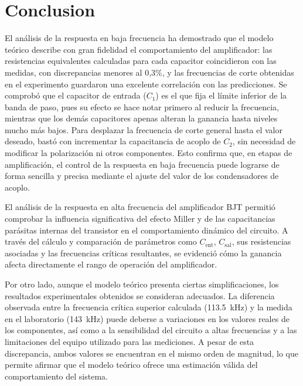 \documentclass[journal]{IEEEtran}
\begin{document}
\section{Conclusion}
\par El análisis de la respuesta en baja frecuencia ha demostrado que el modelo teórico describe con gran fidelidad el comportamiento del amplificador: las resistencias equivalentes calculadas para cada capacitor coincidieron con las medidas, con discrepancias menores al 0,3\%, y las frecuencias de corte obtenidas en el experimento guardaron una excelente correlación con las predicciones. Se comprobó que el capacitor de entrada (\(C_1\)) es el que fija el límite inferior de la banda de paso, pues su efecto se hace notar primero al reducir la frecuencia, mientras que los demás capacitores apenas alteran la ganancia hasta niveles mucho más bajos. Para desplazar la frecuencia de corte general hasta el valor deseado, bastó con incrementar la capacitancia de acoplo de \(C_2\), sin necesidad de modificar la polarización ni otros componentes. Esto confirma que, en etapas de amplificación, el control de la respuesta en baja frecuencia puede lograrse de forma sencilla y precisa mediante el ajuste del valor de los condensadores de acoplo.
\par El análisis de la respuesta en alta frecuencia del amplificador BJT permitió comprobar la influencia significativa del efecto Miller y de las capacitancias parásitas internas del transistor en el comportamiento dinámico del circuito. A través del cálculo y comparación de parámetros como $C_{\text{ent}}$, $C_{\text{sal}}$, sus resistencias asociadas y las frecuencias críticas resultantes, se evidenció cómo la ganancia afecta directamente el rango de operación del amplificador.
\par Por otro lado, aunque el modelo teórico presenta ciertas simplificaciones, los resultados experimentales obtenidos se consideran adecuados. La diferencia observada entre la frecuencia crítica superior calculada (113.5~kHz) y la medida en el laboratorio (143~kHz) puede deberse a variaciones en los valores reales de los componentes, así como a la sensibilidad del circuito a altas frecuencias y a las limitaciones del equipo utilizado para las mediciones. A pesar de esta discrepancia, ambos valores se encuentran en el mismo orden de magnitud, lo que permite afirmar que el modelo teórico ofrece una estimación válida del comportamiento del sistema.


\appendices
\section{}
\end{document}
